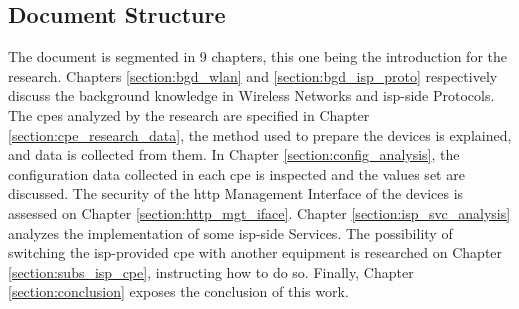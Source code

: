 \subsection{Document Structure}

The document is segmented in 9 chapters, this one being the introduction for the research. Chapters \ref{section:bgd_wlan} and \ref{section:bgd_isp_proto} respectively discuss the background knowledge in Wireless Networks and \gls{isp}-side Protocols. The \glspl{cpe} analyzed by the research are specified in Chapter \ref{section:cpe_research_data}, the method used to prepare the devices is explained, and data is collected from them. In Chapter \ref{section:config_analysis}, the configuration data collected in each \gls{cpe} is inspected and the values set are discussed. The security of the \gls{http} Management Interface of the devices is assessed on Chapter \ref{section:http_mgt_iface}. Chapter \ref{section:isp_svc_analysis} analyzes the implementation of some \gls{isp}-side Services. The possibility of switching the \gls{isp}-provided \gls{cpe} with another equipment is researched on Chapter \ref{section:subs_isp_cpe}, instructing how to do so. Finally, Chapter \ref{section:conclusion} exposes the conclusion of this work.
